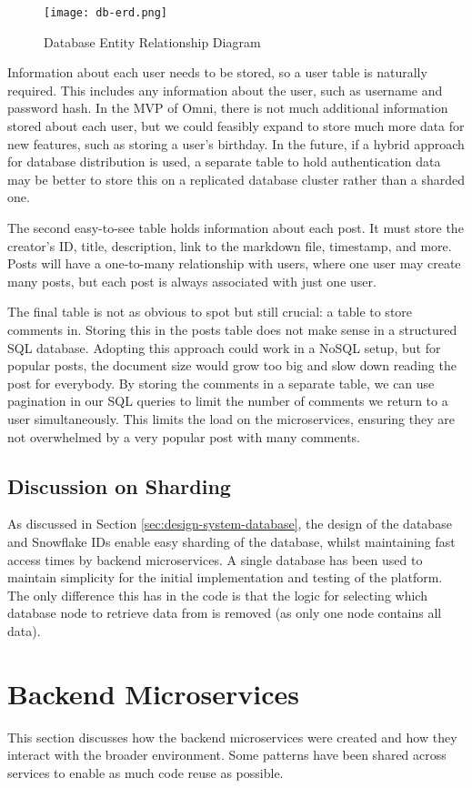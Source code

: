 \begin{figure}[htbp]
\texttt{[image: db-erd.png]}
\centering
\caption{Database Entity Relationship Diagram}
\label{fig:db-erd}
\end{figure}

Information about each user needs to be stored, so a user table is naturally required. This includes any information about the user, such as username and password hash.
In the MVP of Omni, there is not much additional information stored about each user, but we could feasibly expand to store much more data for new features, such as storing a user's birthday.
In the future, if a hybrid approach for database distribution is used, a separate table to hold authentication data may be better to store this on a replicated database cluster rather than a sharded one.

The second easy-to-see table holds information about each post. It must store the creator's ID, title, description, link to the markdown file, timestamp, and more.
Posts will have a one-to-many relationship with users, where one user may create many posts, but each post is always associated with just one user. 

The final table is not as obvious to spot but still crucial: a table to store comments in. Storing this in the posts table does not make sense in a structured SQL database.
Adopting this approach could work in a NoSQL setup, but for popular posts, the document size would grow too big and slow down reading the post for everybody.
By storing the comments in a separate table, we can use pagination in our SQL queries to limit the number of comments we return to a user simultaneously.
This limits the load on the microservices, ensuring they are not overwhelmed by a very popular post with many comments.

\subsection{Discussion on Sharding}
As discussed in Section \ref{sec:design-system-database}, the design of the database and Snowflake IDs enable easy sharding of the database, whilst maintaining fast access times by backend microservices.
A single database has been used to maintain simplicity for the initial implementation and testing of the platform. The only difference this has in the code is that the logic for selecting which database node to retrieve data from is removed (as only one node contains all data).


\section{Backend Microservices}
\label{sec:impl-backend}
This section discusses how the backend microservices were created and how they interact with the broader environment.
Some patterns have been shared across services to enable as much code reuse as possible.

